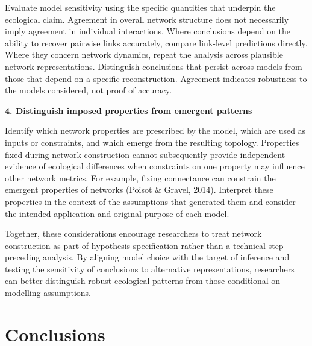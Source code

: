 \documentclass[
]{article}
\begin{document}
\begin{tcolorbox}
Evaluate model sensitivity using the specific quantities that underpin
the ecological claim. Agreement in overall network structure does not
necessarily imply agreement in individual interactions. Where
conclusions depend on the ability to recover pairwise links accurately,
compare link-level predictions directly. Where they concern network
dynamics, repeat the analysis across plausible network representations.
Distinguish conclusions that persist across models from those that
depend on a specific reconstruction. Agreement indicates robustness to
the models considered, not proof of accuracy.

\textbf{4. Distinguish imposed properties from emergent patterns}

Identify which network properties are prescribed by the model, which are
used as inputs or constraints, and which emerge from the resulting
topology. Properties fixed during network construction cannot
subsequently provide independent evidence of ecological differences when
constraints on one property may influence other network metrics. For
example, fixing connectance can constrain the emergent properties of
networks (Poisot \& Gravel, 2014). Interpret these properties in the
context of the assumptions that generated them and consider the intended
application and original purpose of each model.

Together, these considerations encourage researchers to treat network
construction as part of hypothesis specification rather than a technical
step preceding analysis. By aligning model choice with the target of
inference and testing the sensitivity of conclusions to alternative
representations, researchers can better distinguish robust ecological
patterns from those conditional on modelling assumptions.

\end{tcolorbox}

\section{Conclusions}\label{conclusions}
\end{document}
